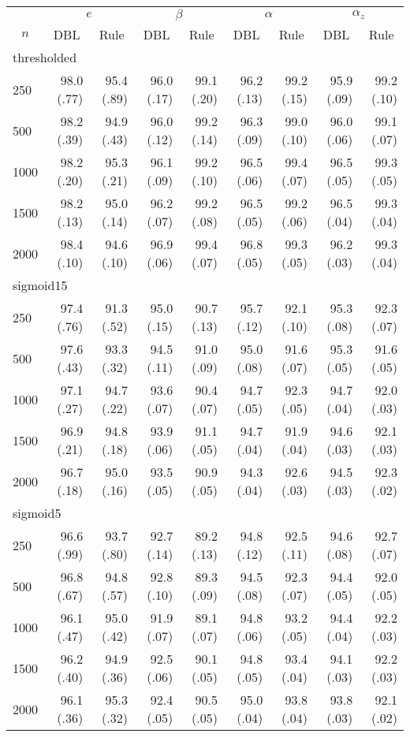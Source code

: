 \documentclass{article}
\begin{document}
\begin{tabular}{lrrrrrrrr}
   \hline
 
       &  \multicolumn{2}{c}{$e$}    & \multicolumn{2}{c}{$\beta$}  & \multicolumn{2}{c}{$\alpha$}  & \multicolumn{2}{c}{$\alpha_z$} \\ 
         \multicolumn{1}{c}{$n$} & \multicolumn{1}{c}{DBL}& \multicolumn{1}{c}{Rule}& \multicolumn{1}{c}{DBL}& \multicolumn{1}{c}{Rule}& \multicolumn{1}{c}{DBL}& \multicolumn{1}{c}{Rule}& \multicolumn{1}{c}{DBL}& \multicolumn{1}{c}{Rule} \\ \hline
            
 \multicolumn{9}{l}{thresholded} \\ 
250 & 98.0 (.77) & 95.4 (.89) & 96.0 (.17) & 99.1 (.20) & 96.2 (.13) & 99.2 (.15) & 95.9 (.09) & 99.2 (.10) \\ 
  500 & 98.2 (.39) & 94.9 (.43) & 96.0 (.12) & 99.2 (.14) & 96.3 (.09) & 99.0 (.10) & 96.0 (.06) & 99.1 (.07) \\ 
  1000 & 98.2 (.20) & 95.3 (.21) & 96.1 (.09) & 99.2 (.10) & 96.5 (.06) & 99.4 (.07) & 96.5 (.05) & 99.3 (.05) \\ 
  1500 & 98.2 (.13) & 95.0 (.14) & 96.2 (.07) & 99.2 (.08) & 96.5 (.05) & 99.2 (.06) & 96.5 (.04) & 99.3 (.04) \\ 
  2000 & 98.4 (.10) & 94.6 (.10) & 96.9 (.06) & 99.4 (.07) & 96.8 (.05) & 99.3 (.05) & 96.2 (.03) & 99.3 (.04) \\ 
          
 \multicolumn{9}{l}{sigmoid15} \\ 
250 & 97.4 (.76) & 91.3 (.52) & 95.0 (.15) & 90.7 (.13) & 95.7 (.12) & 92.1 (.10) & 95.3 (.08) & 92.3 (.07) \\ 
  500 & 97.6 (.43) & 93.3 (.32) & 94.5 (.11) & 91.0 (.09) & 95.0 (.08) & 91.6 (.07) & 95.3 (.05) & 91.6 (.05) \\ 
  1000 & 97.1 (.27) & 94.7 (.22) & 93.6 (.07) & 90.4 (.07) & 94.7 (.05) & 92.3 (.05) & 94.7 (.04) & 92.0 (.03) \\ 
  1500 & 96.9 (.21) & 94.8 (.18) & 93.9 (.06) & 91.1 (.05) & 94.7 (.04) & 91.9 (.04) & 94.6 (.03) & 92.1 (.03) \\ 
  2000 & 96.7 (.18) & 95.0 (.16) & 93.5 (.05) & 90.9 (.05) & 94.3 (.04) & 92.6 (.03) & 94.5 (.03) & 92.3 (.02) \\ 
          
 \multicolumn{9}{l}{sigmoid5} \\ 
250 & 96.6 (.99) & 93.7 (.80) & 92.7 (.14) & 89.2 (.13) & 94.8 (.12) & 92.5 (.11) & 94.6 (.08) & 92.7 (.07) \\ 
  500 & 96.8 (.67) & 94.8 (.57) & 92.8 (.10) & 89.3 (.09) & 94.5 (.08) & 92.3 (.07) & 94.4 (.05) & 92.0 (.05) \\ 
  1000 & 96.1 (.47) & 95.0 (.42) & 91.9 (.07) & 89.1 (.07) & 94.8 (.06) & 93.2 (.05) & 94.4 (.04) & 92.2 (.03) \\ 
  1500 & 96.2 (.40) & 94.9 (.36) & 92.5 (.06) & 90.1 (.05) & 94.8 (.05) & 93.4 (.04) & 94.1 (.03) & 92.2 (.03) \\ 
  2000 & 96.1 (.36) & 95.3 (.32) & 92.4 (.05) & 90.5 (.05) & 95.0 (.04) & 93.8 (.04) & 93.8 (.03) & 92.1 (.02) \\ 
          

\end{tabular}
\end{document}
